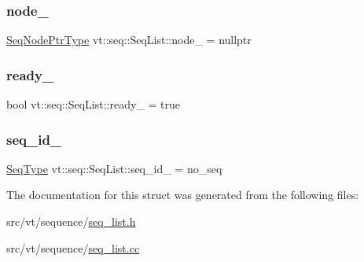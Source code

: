 \subsubsection{\texorpdfstring{node\+\_\+}{node\_}}
{\footnotesize\ttfamily \hyperlink{namespacevt_1_1seq_ae6a4874b585be0612aaca32ca6d2d191}{Seq\+Node\+Ptr\+Type} vt\+::seq\+::\+Seq\+List\+::node\+\_\+ = nullptr\hspace{0.3cm}{\ttfamily [private]}}

\mbox{\label{structvt_1_1seq_1_1_seq_list_aeab1d1e13104f99fdf91eb57bc8f658a}} 
\subsubsection{\texorpdfstring{ready\+\_\+}{ready\_}}
{\footnotesize\ttfamily bool vt\+::seq\+::\+Seq\+List\+::ready\+\_\+ = true\hspace{0.3cm}{\ttfamily [private]}}

\mbox{\label{structvt_1_1seq_1_1_seq_list_abfbd1dc51e017e52745777f1c071b342}} 
\subsubsection{\texorpdfstring{seq\+\_\+id\+\_\+}{seq\_id\_}}
{\footnotesize\ttfamily \hyperlink{namespacevt_1_1seq_a3b612da217ac669d39c159f134ab8434}{Seq\+Type} vt\+::seq\+::\+Seq\+List\+::seq\+\_\+id\+\_\+ = no\+\_\+seq\hspace{0.3cm}{\ttfamily [private]}}



The documentation for this struct was generated from the following files\+:\begin{DoxyCompactItemize}
\item 
src/vt/sequence/\hyperlink{seq__list_8h}{seq\+\_\+list.\+h}\item 
src/vt/sequence/\hyperlink{seq__list_8cc}{seq\+\_\+list.\+cc}\end{DoxyCompactItemize}
